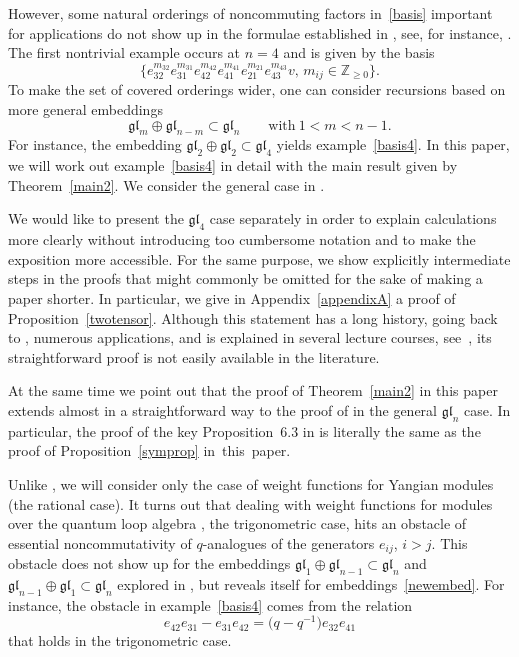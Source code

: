 \documentclass[pdftex]{sigma}
\numberwithin{equation}{section}
\begin{document}
However, some natural orderings of noncommuting factors in~\eqref{basis} important
for applications do not show up in the formulae established in \cite{TVC},
see, for instance, \cite{MV}.
The first nontrivial example occurs at $n=4$ and is given by the basis
\begin{equation}\label{basis4}
\bigl\{e_{32}^{m_{32}}e_{31}^{m_{31}}e_{42}^{m_{42}}e_{41}^{m_{41}}e_{21}^{m_{21}}e_{43}^{m_{43}}v,\,
 m_{ij}\in\mathbb{Z}_{\geq0}\bigr\}.
\end{equation}
To make the set of covered orderings wider, one can consider recursions based on more general
embeddings
\begin{equation}\label{newembed}
\mathfrak{gl}_m\oplus\mathfrak{gl}_{n-m}\subset \mathfrak{gl}_n \qquad \text{with}\ 1<m<n-1.
\end{equation}
For instance, the embedding
$\mathfrak{gl}_2\oplus \mathfrak{gl}_2\subset \mathfrak{gl}_4$ yields example~\eqref{basis4}.
In this paper, we will work out example~\eqref{basis4} in detail with the main result
given by Theorem~\ref{main2}. We consider the general case in \cite{KT}.

We would like to present the $\mathfrak{gl}_4$ case separately in order to explain calculations
more clearly without introducing too cumbersome notation and to make the exposition more
accessible. For the same purpose, we show explicitly intermediate steps in the proofs that
might commonly be omitted for the sake of making a paper shorter. In particular, we give in
Appendix~\ref{appendixA} a proof of Proposition~\ref{twotensor}. Although this statement has a long history,
going back to \cite{Kor}, numerous applications, and is explained in several lecture courses,
see~\cite{S2}, its straightforward proof is not easily available in the literature.

At the same time we point out that the proof of Theorem~\ref{main2} in this paper extends
almost in a straightforward way to the proof of \cite[Theorem~5.5]{KT} in the general
$\mathfrak{gl}_n$ case. In particular, the proof of the key Proposition~6.3 in \cite{KT}
is literally the same as the proof of Proposition~\ref{symprop} in~this~paper.

Unlike \cite{TVC}, we will consider only the case of weight functions for Yangian modules
(the rational case). It turns out that dealing with weight functions for modules over
the quantum loop algebra , the trigonometric case,
hits an obstacle of essential noncommutativity of $q$-analogues of the generators
$e_{ij}$, $i>j$. This obstacle does not show up for the embeddings
$\mathfrak{gl}_1\oplus \mathfrak{gl}_{n-1}\subset \mathfrak{gl}_n$ and
$\mathfrak{gl}_{n-1}\oplus \mathfrak{gl}_1 \subset \mathfrak{gl}_n$ explored in \cite{TVC},
but reveals itself for embeddings~\eqref{newembed}. For instance, the obstacle
in example~\eqref{basis4} comes from the relation
\begin{equation*}
e_{42}e_{31}-e_{31}e_{42}=\bigl(q-q^{-1}\bigr)e_{32}e_{41}
\end{equation*}
that holds in the trigonometric case.
\end{document}
